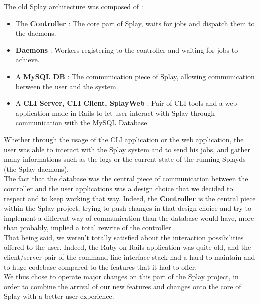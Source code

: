 \documentclass{eplmastersthesis}
\begin{document}
        The old Splay architecture was composed of :

        \begin{itemize}
          \item The \textbf{Controller} : The core part of Splay, waits for jobs
          and dispatch them to the daemons.
          \item \textbf{Daemons} : Workers registering to the controller and waiting
          for jobs to achieve.
          \item A \textbf{MySQL DB} : The communication piece of Splay, allowing
          communication between the user and the system.
          \item A \textbf{CLI Server, CLI Client, SplayWeb} : Pair of CLI tools
          and a web application made in Rails to let user interact with
          Splay through communication with the MySQL Database.
        \end{itemize}

        Whether through the usage of the CLI application or the web application,
        the user was able to interact with the Splay system and to send his
        jobs, and gather many informations such as the logs or the current
        state of the running Splayds (the Splay daemons).\\

        The fact that the database was the central piece of communication
        between the controller and the user applications was a design choice
        that we decided to respect and to keep working that way. Indeed, the
        \textbf{Controller} is the central piece within the Splay project,
        trying to push changes in that design choice and try to implement a
        different way of communication than the database would have, more
        than probably, implied a total rewrite of the controller.\\

        That being said, we weren't totally satisfied about the interaction
        possibilities offered to the user. Indeed, the Ruby on Rails application
        was quite old, and the client/server pair of the command line interface
        stack had a hard to maintain and to huge codebase compared to the
        features that it had to offer.\\

        We thus chose to operate major changes on this part of the Splay
        project, in order to combine the arrival of our new features and
        changes onto the core of Splay with a better user experience.
\end{document}
